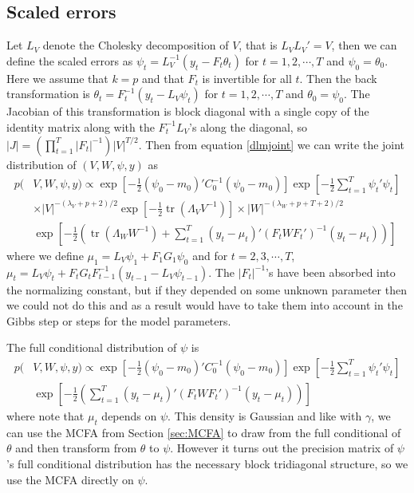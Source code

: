 \documentclass{article}
\DeclareMathOperator{\tr}{tr}
\begin{document}
\subsection{Scaled errors}\label{subsec:SEs}
Let $L_V$ denote the Cholesky decomposition of $V$, that is $L_VL_V'=V$, then we can define the scaled errors as $\psi_t = L_V^{-1}(y_t - F_t\theta_t)$ for $t=1,2,\cdots,T$ and $\psi_0 = \theta_0$. Here we assume that $k=p$ and that $F_t$ is invertible for all $t$. Then the back transformation is $\theta_t = F_t^{-1}(y_t - L_V\psi_t)$ for $t=1,2,\cdots,T$ and $\theta_0=\psi_0$. The Jacobian of this transformation is block diagonal with a single copy of the identity matrix along with the $F_t^{-1}L_V$'s along the diagonal, so $|J|=(\prod_{t=1}^T|F_t|^{-1})|V|^{T/2}$. Then from equation \eqref{dlmjoint} we can write the joint distribution of $(V, W, \psi, y)$ as
\begin{align}
    p(&V,W,\psi,y) \propto \exp\left[-\frac{1}{2}(\psi_0-m_0)'C_0^{-1}(\psi_0-m_0)\right] \exp\left[-\frac{1}{2}\sum_{t=1}^T\psi_t'\psi_t\right] \nonumber\\
  &\times |V|^{-(\lambda_V + p + 2)/2}\exp\left[-\frac{1}{2}\tr\left(\Lambda_VV^{-1}\right)\right]  \times |W|^{-(\lambda_W + p + T + 2)/2} \nonumber\\
   & \exp\left[-\frac{1}{2}\left(\tr\left(\Lambda_WW^{-1}\right) + \sum_{t=1}^T(y_t - \mu_t)'(F_tWF_t')^{-1}(y_t-\mu_t)\right)\right]\label{dlmerrorjoint}
\end{align}
where we define $\mu_1 = L_V\psi_1 + F_1G_1\psi_0$ and for $t=2,3,\cdots,T$, $\mu_t =L_V\psi_t + F_tG_tF_{t-1}^{-1}(y_{t-1} - L_{V}\psi_{t-1})$. The $|F_t|^{-1}$'s have been absorbed into the normalizing constant, but if they depended on some unknown parameter then we could not do this and as a result would have to take them into account in the Gibbs step or steps for the model parameters.

The full conditional distribution of $\psi$ is
\begin{align*}
    p(&V,W,\psi,y) \propto \exp\left[-\frac{1}{2}(\psi_0-m_0)'C_0^{-1}(\psi_0-m_0)\right] \exp\left[-\frac{1}{2}\sum_{t=1}^T\psi_t'\psi_t\right] \nonumber\\
   & \exp\left[-\frac{1}{2}\left(\sum_{t=1}^T(y_t - \mu_t)'(F_tWF_t')^{-1}(y_t-\mu_t)\right)\right]
\end{align*}
where note that $\mu_t$ depends on $\psi$. This density is Gaussian and like with $\gamma$, we can use the MCFA from Section \ref{sec:MCFA} to draw from the full conditional of $\theta$ and then transform from $\theta$ to $\psi$. However it turns out the precision matrix of $\psi$'s full conditional distribution has the necessary block tridiagonal structure, so we use the MCFA directly on $\psi$. 
\end{document}
